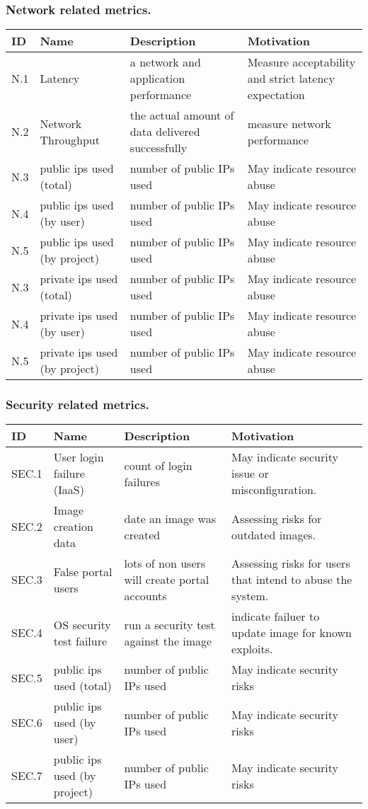\documentclass{beamer}
\newcommand{\eTABLE}{\end{tabular}
\end{center}
\end{scriptsize}
}
\newcommand{\bTABLE}[2]{
\frametitle{#1}
\bigskip
\begin{scriptsize}
\begin{center}
\begin{tabular}{lp{0.15\textwidth}p{0.3\textwidth}p{0.4\textwidth}}
\hline
\rowcolor{blue!20} \bf ID & \bf Name & \bf Description & \bf Motivation \\
\hline}
\newenvironment{METRICTABLE}[2] {\bTABLE{#1}{#2}}{\eTABLE}
\begin{document}
\begin{frame}[shrink]
\begin{METRICTABLE}{Network related metrics.}{T:network}
N.1 & Latency & a network and application performance & Measure acceptability and strict latency expectation \\ \hline
N.2 & Network Throughput& the actual amount of data delivered successfully & measure network performance \\ \hline
N.3 & public ips used (total) &  number of public IPs used &  May indicate resource abuse \\ \hline
N.4 & public ips used (by user) &  number of public IPs used &  May indicate resource abuse \\ \hline
N.5 & public ips used (by project) &  number of public IPs used &  May indicate resource abuse \\ \hline
N.3 & private ips used (total) &  number of public IPs used &  May indicate resource abuse \\ \hline
N.4 & private ips used (by user) &  number of public IPs used &  May indicate resource abuse \\ \hline
N.5 & private ips used (by project) &  number of public IPs used &  May indicate resource abuse \\ \hline
\end{METRICTABLE}
\end{frame}


\begin{frame}[shrink]
\begin{METRICTABLE}{Security related metrics.}{T:security}
SEC.1 &  User login failure (IaaS) &  count of login failures &  May indicate security issue or misconfiguration. \\ \hline
SEC.2 &  Image creation data &  date an image was created &  Assessing risks for outdated images. \\ \hline
SEC.3 &  False portal users &  lots of non users will create portal accounts &  Assessing risks for users that intend to abuse the system. \\ \hline
SEC.4 &  OS security test failure &  run a security test against the image &  indicate failuer to update image for known exploits. \\ \hline
SEC.5 &  public ips used (total) &  number of public IPs used &  May indicate security risks \\ \hline
SEC.6 &  public ips used (by user) &  number of public IPs used &  May indicate security risks \\ \hline
SEC.7 &  public ips used (by project) &  number of public IPs used &  May indicate security risks \\ \hline
\end{METRICTABLE} 
\end{frame}
\end{document}
